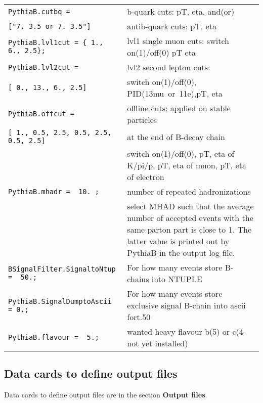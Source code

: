 \begin{tabular}{|p{85mm}|p{80mm}|}
\hline

\verb!PythiaB.cutbq = !
& b-quark cuts: pT,  eta, and(or)    \\
\verb!["7. 3.5 or 7. 3.5"]! &antib-quark cuts: pT,  eta\\

\hline
\verb!PythiaB.lvl1cut = { 1., 6., 2.5};! & lvl1 single muon cuts: switch on(1)/off(0) pT eta\\

\hline
 \verb!PythiaB.lvl2cut = !&lvl2 second lepton cuts: \\
\verb![ 0., 13., 6., 2.5]!& switch on(1)/off(0),
PID(13mu~or~11e),pT, eta\\ \hline
 \verb!PythiaB.offcut = !  & offline cuts: applied on stable particles \\
 \verb![ 1., 0.5, 2.5, 0.5, 2.5, 0.5, 2.5]!        & at the end of B-decay chain \\
            & switch
on(1)/off(0),  pT, eta of K/pi/p,
                                 pT, eta of muon,  pT, eta of electron \\
\hline
\verb!PythiaB.mhadr =  10. ;! &   number of repeated hadronizations  \\

&   select MHAD such that the average number of accepted
events with the same parton part is close to 1. The latter value
is printed out by PythiaB in the output log file.  \\
\hline
\verb!BSignalFilter.SignaltoNtup =  50.; ! &  For how many events store B-chains into NTUPLE  \\


\hline
\verb!PythiaB.SignalDumptoAscii = 0.; ! &  For how many events store exclusive signal B-chain into ascii fort.50 \\
\hline
\verb!PythiaB.flavour =  5.;! & wanted heavy flavour b(5) or c(4-not yet installed)\\
\hline




\end{tabular}




\subsection{  Data cards to define output files }

Data cards to define output files are  in the section {\bf Output files}.



